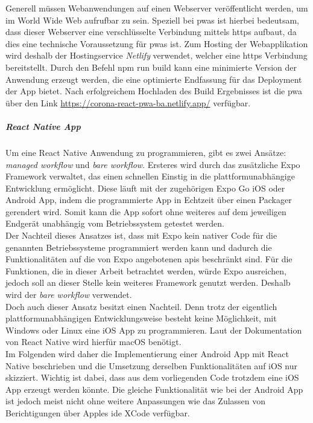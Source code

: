 Generell müssen Webanwendungen auf einen Webserver veröffentlicht werden, um im World Wide Web aufrufbar zu sein.
Speziell bei \acp{pwa} ist hierbei bedeutsam, dass dieser Webserver eine verschlüsselte Verbindung mittels \ac{https} aufbaut, da dies eine technische Voraussetzung für \acp{pwa} ist.
Zum Hosting der Webapplikation wird deshalb der Hostingservice \textit{Netlify} verwendet, welcher eine \ac{https} Verbindung bereitstellt.
Durch den Befehl \glqq npm run build\grqq{} kann eine minimierte Version der Anwendung erzeugt werden, die eine optimierte Endfassung für das Deployment der App bietet.
Nach erfolgreichem Hochladen des Build Ergebnisses ist die \ac{pwa} über den Link \url{https://corona-react-pwa-ba.netlify.app/} verfügbar.

\subparagraph{React Native App\\}
Um eine React Native Anwendung zu programmieren, gibt es zwei Ansätze: \textit{managed workflow} und \textit{bare workflow}.
Ersteres wird durch das zusätzliche Expo Framework verwaltet, das einen schnellen Einstig in die plattformunabhängige Entwicklung ermöglicht.
Diese läuft mit der zugehörigen Expo Go iOS oder Android App, indem die programmierte App in Echtzeit über einen Packager gerendert wird.
Somit kann die App sofort ohne weiteres auf dem jeweiligen Endgerät unabhängig vom Betriebssystem getestet werden.\\
Der Nachteil dieses Ansatzes ist, dass mit Expo kein nativer Code für die genannten Betriebssysteme programmiert werden kann und dadurch die Funktionalitäten auf die von Expo angebotenen \ac{api}s beschränkt sind.
Für die Funktionen, die in dieser Arbeit betrachtet werden, würde Expo ausreichen, jedoch soll an dieser Stelle kein weiteres Framework genutzt werden.
Deshalb wird der \textit{bare workflow} verwendet.\\
Doch auch dieser Ansatz besitzt einen Nachteil.
Denn trotz der eigentlich plattformunabhängigen Entwicklungsweise besteht keine Möglichkeit, mit Windows oder Linux eine iOS App zu programmieren.
Laut der Dokumentation von React Native wird hierfür macOS benötigt.\\
Im Folgenden wird daher die Implementierung einer Android App mit React Native beschrieben und die Umsetzung derselben Funktionalitäten auf iOS nur skizziert.
Wichtig ist dabei, dass aus dem vorliegenden Code trotzdem eine iOS App erzeugt werden könnte.
Die gleiche Funktionalität wie bei der Android App ist jedoch meist nicht ohne weitere Anpassungen wie das Zulassen von Berichtigungen über Apples \ac{ide} XCode verfügbar.

